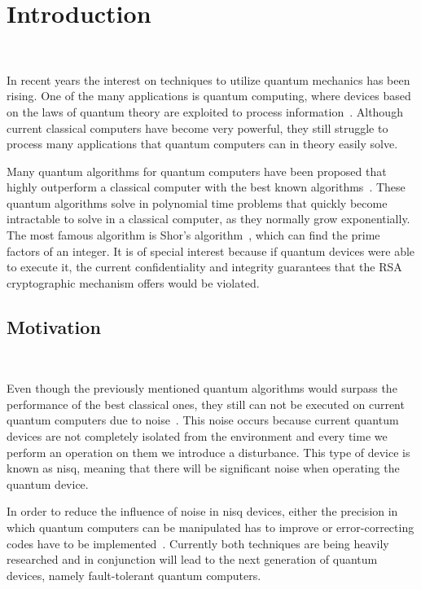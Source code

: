 \chapter{Introduction}\label{chapter:introduction} \

In recent years the interest on techniques to utilize quantum mechanics has been rising.
One of the many applications is quantum computing, where devices based on the laws
of quantum theory are exploited to process information~\cite{national_academies_of_sciences_engineering_and_medicine_quantum_2019}.
Although current classical computers have become very powerful, they still struggle to
process many applications that quantum computers can in theory easily solve. \

Many quantum algorithms for quantum computers have been proposed that highly
outperform a classical computer with the best known algorithms~\cite{shor_polynomial-time_1997, van_dam_quantum_2006, hallgren_polynomial-time_2007}.
These quantum algorithms solve in polynomial time problems that quickly become
intractable to solve in a classical computer, as they normally grow exponentially.
The most famous algorithm is Shor's algorithm~\cite{shor_polynomial-time_1997}, which can find the prime factors
of an integer. It is of special interest because if quantum devices
were able to execute it, the current confidentiality and integrity guarantees
that the RSA~\cite{rivest_method_1978} cryptographic mechanism offers would be violated. \

\section{Motivation} \

Even though the previously mentioned quantum algorithms would surpass the performance
of the best classical ones, they still can not be executed on current quantum
computers due to noise~\cite{preskill_quantum_2018}. This noise occurs because
current quantum devices are not completely isolated from the environment and every
time we perform an operation on them we introduce a disturbance. This type of device
is known as \ac{nisq}, meaning that there will be significant noise when operating
the quantum device. \

In order to reduce the influence of noise in \ac{nisq} devices, either the precision
in which quantum computers can be manipulated has to improve or error-correcting
codes have to be implemented~\cite{shor_quantum_nodate}. Currently both techniques are
being heavily researched and in conjunction will lead to the next generation of
quantum devices, namely fault-tolerant quantum computers. \

